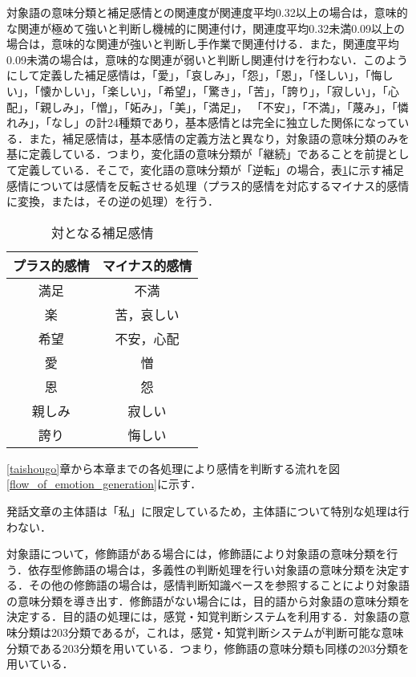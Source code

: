 \documentclass[japanese]{jnlp_1.3a}
\begin{document}
対象語の意味分類と補足感情との関連度が関連度平均0.32以上の場合は，意味的な関連が極めて強いと判断し機械的に関連付け，関連度平均0.32未満0.09以上の場合は，意味的な関連が強いと判断し手作業で関連付ける．また，関連度平均0.09未満の場合は，意味的な関連が弱いと判断し関連付けを行わない．このようにして定義した補足感情は，「愛」，「哀しみ」，「怨」，「恩」，「怪しい」，「悔しい」，「懐かしい」，「楽しい」，「希望」，「驚き」，「苦」，「誇り」，「寂しい」，「心配」，「親しみ」，「憎」，「妬み」，「美」，「満足」，
「不安」，「不満」，「蔑み」，「憐れみ」，「なし」の計24種類であり，基本感情とは完全に独立した関係になっている．また，補足感情は，基本感情の定義方法と異なり，対象語の意味分類のみを基に定義している．つまり，変化語の意味分類が「継続」であることを前提として定義している．そこで，変化語の意味分類が「逆転」の場合，表\ref{pair_of_supplementation_emotion}に示す補足感情については感情を反転させる処理（プラス的感情を対応するマイナス的感情に変換，または，その逆の処理）を行う．

\begin{table}[t]
\caption{対となる補足感情}
\label{pair_of_supplementation_emotion}
\begin{center}
\begin{tabular}{|c|c|} \hline
プラス的感情 & マイナス的感情 \\ \hline\hline
満足 & 不満  \\ \hline
楽 & 苦，哀しい  \\ \hline
希望 & 不安，心配  \\ \hline
愛 & 憎  \\ \hline
恩 & 怨  \\ \hline
親しみ & 寂しい  \\ \hline
誇り & 悔しい  \\ \hline
\end{tabular}
\end{center}
\end{table}

\ref{taishougo}章から本章までの各処理により感情を判断する流れを図\ref{flow_of_emotion_generation}に示す．

発話文章の主体語は「私」に限定しているため，主体語について特別な処理は行わない．

対象語について，修飾語がある場合には，修飾語により対象語の意味分類を行う．依存型修飾語の場合は，多義性の判断処理を行い対象語の意味分類を決定する．その他の修飾語の場合は，感情判断知識ベースを参照することにより対象語の意味分類を導き出す．修飾語がない場合には，目的語から対象語の意味分類を決定する．目的語の処理には，感覚・知覚判断システムを利用する．対象語の意味分類は203分類であるが，これは，感覚・知覚判断システムが判断可能な意味分類である203分類を用いている．つまり，修飾語の意味分類も同様の203分類を用いている．
\end{document}
